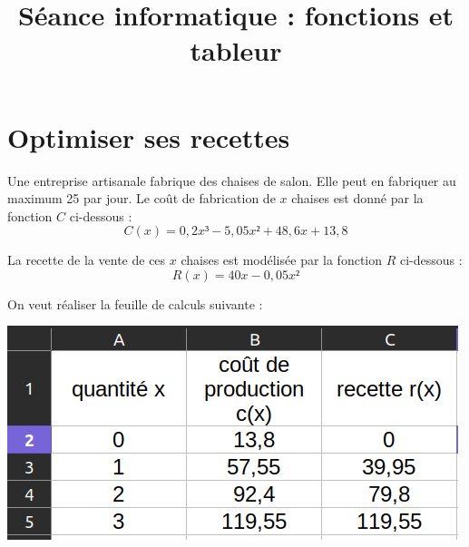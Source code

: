 \documentclass[
	classe=$1^{ere}STI2D$,
	headerTitle=Informatique
]{exercice}
\title{Séance informatique : fonctions et tableur}
\begin{document}
\maketitle

\section{Optimiser ses recettes}

\begin{tcolorbox}
	Une entreprise artisanale fabrique des chaises de salon. Elle peut en fabriquer au maximum 25 par jour. Le coût de fabrication de $x$ chaises est donné par la fonction $C$ ci-dessous :
	$$ C(x) = 0,2x³ - 5,05x² + 48,6x + 13,8 $$

	La recette de la vente de ces $x$ chaises est modélisée par la fonction $R$ ci-dessous :
	$$ R(x) = 40x - 0,05x² $$
\end{tcolorbox}


On veut réaliser la feuille de calculs suivante :

\begin{center}
	\includegraphics[width=0.5\linewidth]{Activité - tableur (image 1).png}
\end{center}
\end{document}
